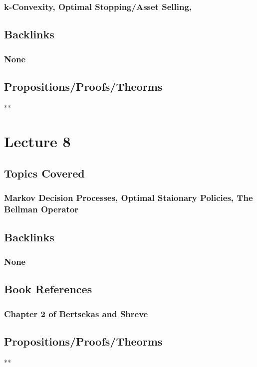 \documentclass[11pt]{article}
\begin{document}
\subsubsection*{k-Convexity, Optimal Stopping/Asset Selling,}
\label{sec:org035bb5c}
\subsection*{Backlinks}
\label{sec:org8bc5ce4}
\subsubsection*{None}
\label{sec:orgfecde59}
\subsection*{Propositions/Proofs/Theorms}
\label{sec:orge42a5fd}
**

\section*{Lecture 8}
\label{sec:org6304f71}
\subsection*{Topics Covered}
\label{sec:org470ae37}
\subsubsection*{Markov Decision Processes, Optimal Staionary Policies, The Bellman Operator}
\label{sec:org5df7359}
\subsection*{Backlinks}
\label{sec:orgad5a26c}
\subsubsection*{None}
\label{sec:org5277924}
\subsection*{Book References}
\label{sec:orgce6ef2f}
\subsubsection*{Chapter 2 of Bertsekas and Shreve}
\label{sec:orgb6bb555}
\subsection*{Propositions/Proofs/Theorms}
\label{sec:orged1b181}
**
\end{document}
